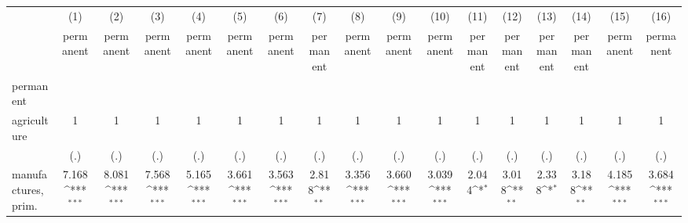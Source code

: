{
\def\sym#1{\ifmmode^{#1}\else\(^{#1}\)\fi}
\begin{tabular}{l*{16}{c}}
\hline\hline
                    &\multicolumn{1}{c}{(1)}&\multicolumn{1}{c}{(2)}&\multicolumn{1}{c}{(3)}&\multicolumn{1}{c}{(4)}&\multicolumn{1}{c}{(5)}&\multicolumn{1}{c}{(6)}&\multicolumn{1}{c}{(7)}&\multicolumn{1}{c}{(8)}&\multicolumn{1}{c}{(9)}&\multicolumn{1}{c}{(10)}&\multicolumn{1}{c}{(11)}&\multicolumn{1}{c}{(12)}&\multicolumn{1}{c}{(13)}&\multicolumn{1}{c}{(14)}&\multicolumn{1}{c}{(15)}&\multicolumn{1}{c}{(16)}\\
                    &\multicolumn{1}{c}{permanent}&\multicolumn{1}{c}{permanent}&\multicolumn{1}{c}{permanent}&\multicolumn{1}{c}{permanent}&\multicolumn{1}{c}{permanent}&\multicolumn{1}{c}{permanent}&\multicolumn{1}{c}{permanent}&\multicolumn{1}{c}{permanent}&\multicolumn{1}{c}{permanent}&\multicolumn{1}{c}{permanent}&\multicolumn{1}{c}{permanent}&\multicolumn{1}{c}{permanent}&\multicolumn{1}{c}{permanent}&\multicolumn{1}{c}{permanent}&\multicolumn{1}{c}{permanent}&\multicolumn{1}{c}{permanent}\\
\hline
permanent           &                     &                     &                     &                     &                     &                     &                     &                     &                     &                     &                     &                     &                     &                     &                     &                     \\
agriculture         &           1         &           1         &           1         &           1         &           1         &           1         &           1         &           1         &           1         &           1         &           1         &           1         &           1         &           1         &           1         &           1         \\
                    &         (.)         &         (.)         &         (.)         &         (.)         &         (.)         &         (.)         &         (.)         &         (.)         &         (.)         &         (.)         &         (.)         &         (.)         &         (.)         &         (.)         &         (.)         &         (.)         \\
[1em]
manufactures, prim. &       7.168\sym{***}&       8.081\sym{***}&       7.568\sym{***}&       5.165\sym{***}&       3.661\sym{***}&       3.563\sym{***}&       2.818\sym{**} &       3.356\sym{***}&       3.660\sym{***}&       3.039\sym{***}&       2.044\sym{*}  &       3.018\sym{**} &       2.338\sym{*}  &       3.188\sym{**} &       4.185\sym{***}&       3.684\sym{***}\\

\end{tabular}}
